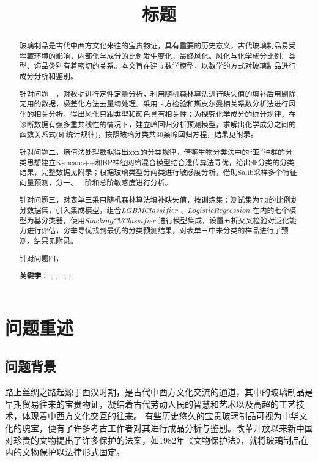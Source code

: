 \documentclass[UTF8]{ctexart}
\title{\textbf{标题}}
\date{} %
\begin{document}
\maketitle{}
\renewcommand{\abstractname}{\Large 摘要\\}   %
\begin{abstract}
	\normalsize
    \fontsize{12pt}{18pt}
	
    玻璃制品是古代中西方文化来往的宝贵物证，具有重要的历史意义。古代玻璃制品易受埋藏环境的影响，内部化学成分的比例发生变化，最终风化。风化与化学成分比例、类型、饰品类别有着密切的关系。本文旨在建立数学模型，以数学的方式对玻璃制品进行成分分析和鉴别。

    针对问题一，对数据进行定性定量分析，利用随机森林算法进行缺失值的填补后用剔除无用的数据，极差化方法去量纲处理。采用卡方检验和斯皮尔曼相关系数分析法进行风化的相关分析，得出风化只跟类型和颜色具有相关性；为探究化学成分的统计规律，在诊断数据有强多重共线性的情况下，建立岭回归分析预测模型，求解出化学成分之间的函数关系式(即统计规律)，按照玻璃分类共30条岭回归方程，结果见附录。

    针对问题二，熵值法处理数据得出xxx的分类规律，借鉴生物分类法中的“亚”种群的分类思想建立K-means++和BP神经网络混合模型结合遗传算法寻优，给出亚分类的分类结果，完整数据见附录；根据玻璃类型分两类进行敏感度分析，借助Salib采样多个特征向量预测，分一、二阶和总阶敏感度进行分析。

    针对问题三，对表单三采用随机森林算法填补缺失值，按训练集：测试集为7:3的比例划分数据集，引入集成模型，组合$LGBMClassifier$ 、$LogisticRegression$ 在内的七个模型为基分类器，使用$StackingCV Classif ier$ 进行模型集成，设置五折交叉检验对泛化能力进行评估，穷举寻优找到最优的分类预测结果，对表单三中未分类的样品进行了预测，结果见附录。

    针对问题四，


	\textbf{关键字}： ;  ;  ;  ;  ;   %
\end{abstract}
\thispagestyle{empty}    %
\newpage

\setcounter{page}{1}  %

\section{问题重述}

\subsection{问题背景}
路上丝绸之路起源于西汉时期，是古代中西方文化交流的通道，其中的玻璃制品是早期贸易往来的宝贵物证，凝结着古代劳动人民的智慧和艺术以及高超的工艺技术，体现着中西方文化交互的往来。
有些历史悠久的宝贵玻璃制品可视为中华文化的瑰宝，便有了许多考古工作者对其进行成品分析与鉴别。改革开放以来新中国对珍贵的文物提出了许多保护的法案，如1982年《文物保护法》，就将玻璃制品在内的文物保护以法律形式固定。
\end{document}
